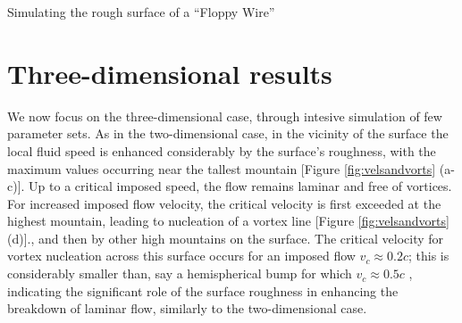 \begin{chapter}{\label{cha:afm}Simulating the rough surface of a ``Floppy Wire''}

 
\section{Three-dimensional results}
We now focus on the three-dimensional case, through intesive simulation of few parameter sets. As in the two-dimensional case, in the vicinity of the surface the local fluid speed is enhanced considerably by the {surface's} roughness, with the maximum values occurring near the tallest mountain [Figure \ref{fig:velsandvorts} (a-c)]. Up to a critical imposed speed, the flow remains laminar and free of vortices.  For increased imposed flow velocity, the critical velocity is first exceeded at the highest mountain, leading to nucleation of a vortex line [Figure \ref{fig:velsandvorts} (d)]., and then by other high mountains on the surface.  The critical velocity for vortex nucleation across this surface occurs for an imposed flow $v_c\approx 0.2 c$; this is considerably smaller than, say a hemispherical bump for which $v_c \approx 0.5 c$ \cite{win01},  indicating the significant role of the surface roughness in enhancing the breakdown of laminar flow, similarly to the two-dimensional case.


\end{chapter}
